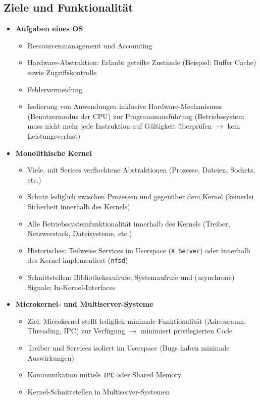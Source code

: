 \subsection{Ziele und Funktionalität}
\begin{itemize}
	\item \textbf{Aufgaben eines OS}
	\begin{itemize}
		\item Ressourcenmanagement und Accounting
		\item Hardware-Abstraktion: Erlaubt geteilte Zustände (Beispiel: Buffer Cache) sowie Zugriffskontrolle
		\item Fehlervermeidung
		\item Isolierung von Anwendungen inklusive Hardware-Mechanismus (Benutzermodus der CPU) zur Programmausführung (Betriebssystem muss nicht mehr jede Instruktion auf Gültigkeit überprüfen \(\rightarrow\) kein Leistungsverlust)
	\end{itemize}
	\item \textbf{Monolithische Kernel}
	\begin{itemize}
		\item Viele, mit Serices verflochtene Abstraktionen (Prozesse, Dateien, Sockets, etc.)
		\item Schutz lediglich zwischen Prozessen und gegenüber dem Kernel (keinerlei Sicherheit innerhalb des Kernels)
		\item Alle Betriebssystemfunktionalität innerhalb des Kernels (Treiber, Netzwerstack, Dateisysteme, etc.)
		\item Historisches: Teilweise Services im Userspace (\texttt{X Server}) oder innerhalb des Kernel implementiert (\texttt{nfsd})
		\item Schnittstellen: Bibliotheksaufrufe; Systemaufrufe und (asynchrone) Signale; In-Kernel-Interfaces
	\end{itemize}
	\item \textbf{Microkernel- und Multiserver-Systeme}
	\begin{itemize}
		\item Ziel: Microkernel stellt lediglich minimale Funktionalität (Adressraum, Threading, IPC) zur Verfügung \(\rightarrow\) minimiert privilegierten Code
		\item Treiber und Services isoliert im Userspace (Bugs haben minimale Auswirkungen)
		\item Kommunikation mittels \texttt{IPC} oder Shared Memory
		\item Kernel-Schnittstellen in Multiserver-Systemen

\end{itemize}
\end{itemize}
